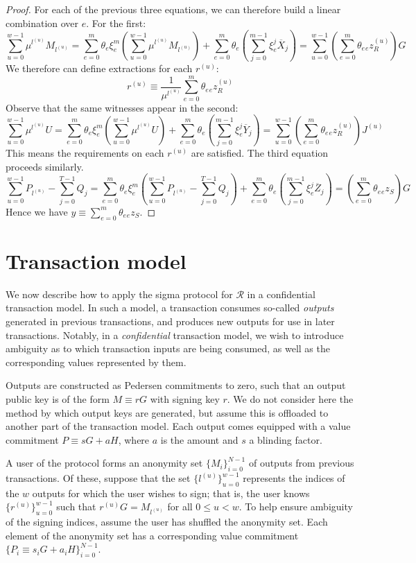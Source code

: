 \documentclass{article}
\newcommand{\sumj}{\sum_{j=0}^{m-1}}
\newcommand{\sumu}{\sum_{u=0}^{w-1}}
\theoremstyle{definition}
\begin{document}
\begin{proof}
For each of the previous three equations, we can therefore build a linear combination over $e$. For the first:
$$\sumu \mu^{l^{(u)}} M_{l^{(u)}} = \sum_{e=0}^m \theta_e\xi_e^m \left( \sumu \mu^{l^{(u)}} M_{l^{(u)}} \right) + \sum_{e=0}^m \theta_e \left( \sumj \xi_e^j \overline{X}_j \right) = \sumu \left( \sum_{e=0}^m \theta_e {}_ez^{(u)}_R \right) G$$
We therefore can define extractions for each $r^{(u)}$:
$$r^{(u)} \equiv \frac{1}{\mu^{l^{(u)}}} \sum_{e=0}^m \theta_e {}_ez^{(u)}_R$$
Observe that the same witnesses appear in the second:
$$\sumu \mu^{l^{(u)}} U = \sum_{e=0}^m \theta_e\xi_e^m \left( \sumu \mu^{l^{(u)}} U \right) + \sum_{e=0}^m \theta_e \left( \sumj \xi_e^j \overline{Y}_j \right) = \sumu \left( \sum_{e=0}^m \theta_e {}_ez^{(u)}_R \right) J^{(u)}$$
This means the requirements on each $r^{(u)}$ are satisfied. The third equation proceeds similarly.
$$\sumu P_{l^{(u)}} - \sum_{j=0}^{T-1} Q_j = \sum_{e=0}^m \theta_e\xi_e^m \left( \sumu P_{l^{(u)}} - \sum_{j=0}^{T-1} Q_j \right) + \sum_{e=0}^m \theta_e \left( \sumj \xi_e^j \overline{Z}_j \right) = \left( \sum_{e=0}^m \theta_e {}_ez_S  \right)G$$
Hence we have $y \equiv \sum_{e=0}^m \theta_e {}_ez_S$.
\end{proof}


\section{Transaction model}
We now describe how to apply the sigma protocol for $\mathcal{R}$ in a confidential transaction model.
In such a model, a transaction consumes so-called \textit{outputs} generated in previous transactions, and produces new outputs for use in later transactions.
Notably, in a \textit{confidential} transaction model, we wish to introduce ambiguity as to which transaction inputs are being consumed, as well as the corresponding values represented by them.

Outputs are constructed as Pedersen commitments to zero, such that an output public key is of the form $M \equiv rG$ with signing key $r$.
We do not consider here the method by which output keys are generated, but assume this is offloaded to another part of the transaction model.
Each output comes equipped with a value commitment $P \equiv sG + aH$, where $a$ is the amount and $s$ a blinding factor.

A user of the protocol forms an anonymity set $\{M_i\}_{i=0}^{N-1}$ of outputs from previous transactions.
Of these, suppose that the set $\{l^{(u)}\}_{u=0}^{w-1}$ represents the indices of the $w$ outputs for which the user wishes to sign; that is, the user knows $\{r^{(u)}\}_{u=0}^{w-1}$ such that $r^{(u)}G = M_{l^{(u)}}$ for all $0 \leq u < w$.
To help ensure ambiguity of the signing indices, assume the user has shuffled the anonymity set.
Each element of the anonymity set has a corresponding value commitment $\{P_i \equiv s_iG + a_iH\}_{i=0}^{N-1}$.
\end{document}
